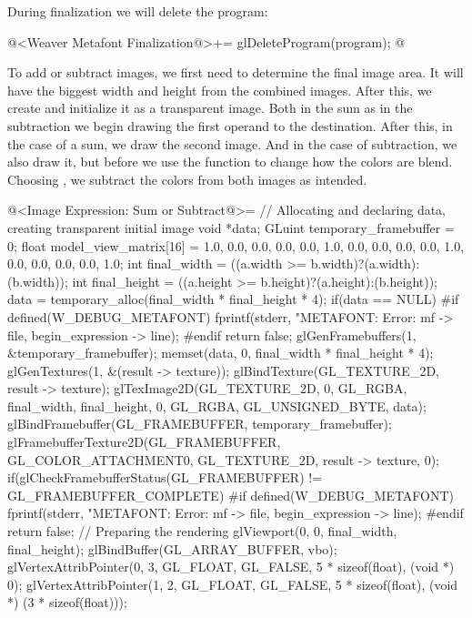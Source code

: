 During finalization we will delete the program:

\iniciocodigo
@<Weaver Metafont Finalization@>+=
glDeleteProgram(program);
@
\fimcodigo

To add or subtract images, we first need to determine the final image
area. It will have the biggest width and height from the combined
images. After this, we create and initialize it as a transparent
image. Both in the sum as in the subtraction we begin drawing the
first operand to the destination. After this, in the case of a sum, we
draw the second image. And in the case of subtraction, we also draw
it, but before we use the function  to
change how the colors are
blend. Choosing , we subtract the
colors from both images as intended.

\iniciocodigo
@<Image Expression: Sum or Subtract@>=
// Allocating and declaring data, creating transparent initial image
void *data;
GLuint temporary_framebuffer = 0;
float model_view_matrix[16] = {1.0, 0.0, 0.0, 0.0,
                               0.0, 1.0, 0.0, 0.0,
                               0.0, 0.0, 1.0, 0.0,
                               0.0, 0.0, 0.0, 1.0};
int final_width = ((a.width >= b.width)?(a.width):(b.width));
int final_height = ((a.height >= b.height)?(a.height):(b.height));
data = temporary_alloc(final_width * final_height * 4);
if(data == NULL){
#if defined(W_DEBUG_METAFONT)
  fprintf(stderr, "METAFONT: Error: %
          mf -> file, begin_expression -> line);
#endif
  return false;
}
glGenFramebuffers(1, &temporary_framebuffer);
memset(data, 0, final_width * final_height * 4);
glGenTextures(1, &(result -> texture)); 
glBindTexture(GL_TEXTURE_2D, result -> texture);
glTexImage2D(GL_TEXTURE_2D, 0, GL_RGBA, final_width, final_height, 0, GL_RGBA,
             GL_UNSIGNED_BYTE, data);
glBindFramebuffer(GL_FRAMEBUFFER, temporary_framebuffer);
glFramebufferTexture2D(GL_FRAMEBUFFER, GL_COLOR_ATTACHMENT0, GL_TEXTURE_2D,
                       result -> texture, 0);
if(glCheckFramebufferStatus(GL_FRAMEBUFFER) != GL_FRAMEBUFFER_COMPLETE){
#if defined(W_DEBUG_METAFONT)
  fprintf(stderr, "METAFONT: Error: %
          mf -> file, begin_expression -> line);
#endif
  return false;
}
// Preparing the rendering
glViewport(0, 0, final_width, final_height);
glBindBuffer(GL_ARRAY_BUFFER, vbo);
glVertexAttribPointer(0, 3, GL_FLOAT, GL_FALSE, 5 * sizeof(float), (void *) 0);
glVertexAttribPointer(1, 2, GL_FLOAT, GL_FALSE, 5 * sizeof(float),
                      (void *) (3 * sizeof(float)));
